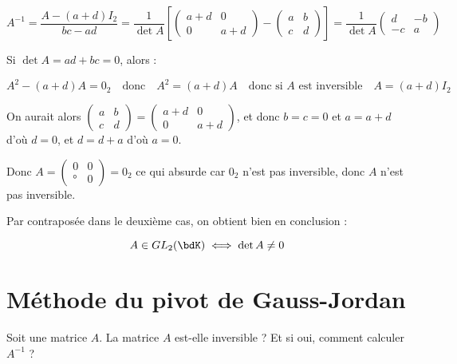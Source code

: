 \documentclass[a4paper,french,bookmarks]{article}
\begin{document}
{\begin{enumerate}
        \[ A^{-1} = \dfrac{A-(a+d)I_2}{bc-ad} = \dfrac{1}{\det A}\left[\begin{pmatrix}
                a+d & 0\\
                0 & a+d
            \end{pmatrix} - \begin{pmatrix}
                a & b\\
                c & d
            \end{pmatrix}\right] = \dfrac{1}{\det A}\begin{pmatrix}
                d & -b\\
                -c & a
            \end{pmatrix}\]
            
            \ithand Si $\det A = ad + bc = 0$, alors :
            
            \[ A^2 - (a+d)A = 0_2 \quad\text{donc}\quad A^2 = (a+d)A \quad\text{donc si $A$ est inversible}\quad A = (a+d)I_2\]
            
            On aurait alors $\begin{pmatrix}
                a & b\\
                c & d
            \end{pmatrix} = \begin{pmatrix}
                a+d & 0\\
                0 & a+d
            \end{pmatrix}$, et donc $b = c = 0$ et $a = a+d$ d'où $d = 0$, et $d = d+a$ d'où $a = 0$.
            
            Donc $A = \begin{pmatrix}
                0 & 0\\
                ° & 0
            \end{pmatrix} = 0_2$ ce qui absurde car $0_2$ n'est pas inversible, donc $A$ n'est pas inversible.
            
            \ithand Par contraposée dans le deuxième cas, on obtient bien en conclusion :
            
            \[ A \in GL_2(\bdK) \iff \det A \neq 0 \]
    \end{enumerate}
}
\newpage

\section*{Méthode du pivot de Gauss-Jordan}

Soit une matrice $A$. La matrice $A$ est-elle inversible ? Et si oui, comment calculer $A^{-1}$ ?
\end{document}
